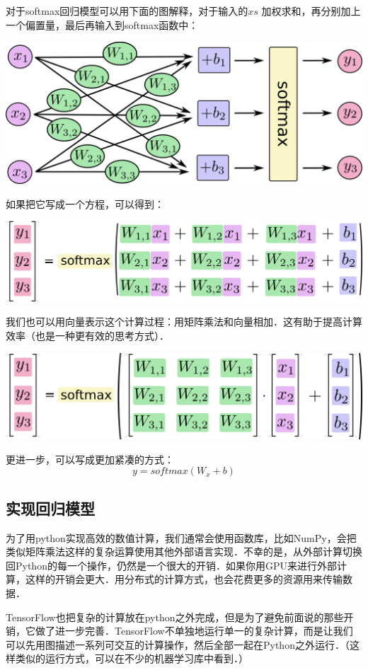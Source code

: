 对于softmax回归模型可以用下面的图解释，对于输入的$xs$ 加权求和，再分别加上一个偏置量，最后再输入到softmax函数中：
\begin{center}
\includegraphics[width=.65\textwidth]{../SOURCE/images/softmax-regression-scalargraph.png}
\end{center}
如果把它写成一个方程，可以得到：
\begin{center}
\includegraphics[width=.68\textwidth]{../SOURCE/images/softmax-regression-scalarequation.png}
\end{center}
我们也可以用向量表示这个计算过程：用矩阵乘法和向量相加．这有助于提高计算效率（也是一种更有效的思考方式）．
\begin{center}
\includegraphics[width=.68\textwidth]{../SOURCE/images/softmax-regression-vectorequation.png}
\end{center}
更进一步，可以写成更加紧凑的方式：
\begin{equation}
y = softmax(W_x+b)
\end{equation}

\subsection {实现回归模型}
为了用python实现高效的数值计算，我们通常会使用函数库，比如NumPy，会把类似矩阵乘法这样的复杂运算使用其他外部语言实现．不幸的是，从外部计算切换回Python的每一个操作，仍然是一个很大的开销．如果你用GPU来进行外部计算，这样的开销会更大．用分布式的计算方式，也会花费更多的资源用来传输数据．

TensorFlow也把复杂的计算放在python之外完成，但是为了避免前面说的那些开销，它做了进一步完善．TensorFlow不单独地运行单一的复杂计算，而是让我们可以先用图描述一系列可交互的计算操作，然后全部一起在Python之外运行．（这样类似的运行方式，可以在不少的机器学习库中看到．）

